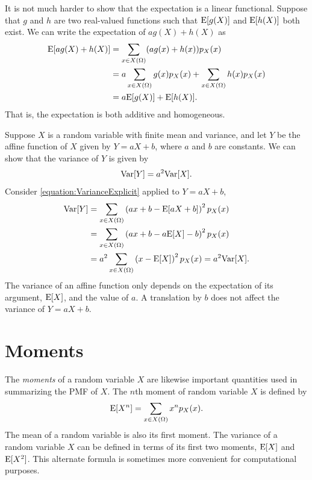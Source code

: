 It is not much harder to show that the expectation is a linear functional.
Suppose that $g$ and $h$ are two real-valued functions such that $\mathrm{E} [g(X)]$ and $\mathrm{E} [h(X)]$ both exist.
We can write the expectation of $a g(X) + h(X)$ as
\begin{equation*}
\begin{split}
\mathrm{E} [ a g(X) + h(X) ] &= \sum_{x \in X(\Omega)} (a g(x) + h(x)) p_X(x) \\
&= a \sum_{x \in X(\Omega)} g(x) p_X(x) + \sum_{x \in X(\Omega)} h(x) p_X(x) \\
&= a \mathrm{E} [g(X)] + \mathrm{E} [h(X)] .
\end{split}
\end{equation*}
That is, the expectation is both additive and homogeneous.

Suppose $X$ is a random variable with finite mean and variance, and let $Y$ be the affine function of $X$ given by $Y = aX + b$, where $a$ and $b$ are constants.
We can show that the variance of $Y$ is given by
\begin{equation*}
\mathrm{Var} [Y] = a^2 \mathrm{Var} [X].
\end{equation*}
Consider \eqref{equation:VarianceExplicit} applied to $Y = aX + b$,
\begin{equation*}
\begin{split}
\mathrm{Var} [Y]
&= \sum_{x \in X(\Omega)} \left( ax + b - \mathrm{E} [aX + b] \right)^2 p_X(x) \\
&= \sum_{x \in X(\Omega)} \left( ax + b - a \mathrm{E} [X] - b \right)^2 p_X(x) \\
&= a^2 \sum_{x \in X(\Omega)} \left( x - \mathrm{E} [X] \right)^2 p_X(x)
= a^2 \mathrm{Var} [X] .
\end{split}
\end{equation*}
The variance of an affine function only depends on the expectation of its argument, $\mathrm{E} [X]$, and the value of $a$.
A translation by $b$ does not affect the variance of $Y = aX + b$.


\section{Moments}

The \emph{moments} of a random variable $X$ are likewise important quantities used in summarizing the PMF of $X$. 
The $n$th moment of random variable $X$ is defined by
\begin{equation} \label{equation:DiscreteMoments}
\mathrm{E} [X^n] = \sum_{x \in X(\Omega)} x^n p_X (x) .
\end{equation}
The mean of a random variable is also its first moment.
The variance of a random variable $X$ can be defined in terms of its first two moments, $\mathrm{E} [X]$ and $\mathrm{E} [X^2]$.
This alternate formula is sometimes more convenient for computational purposes.

